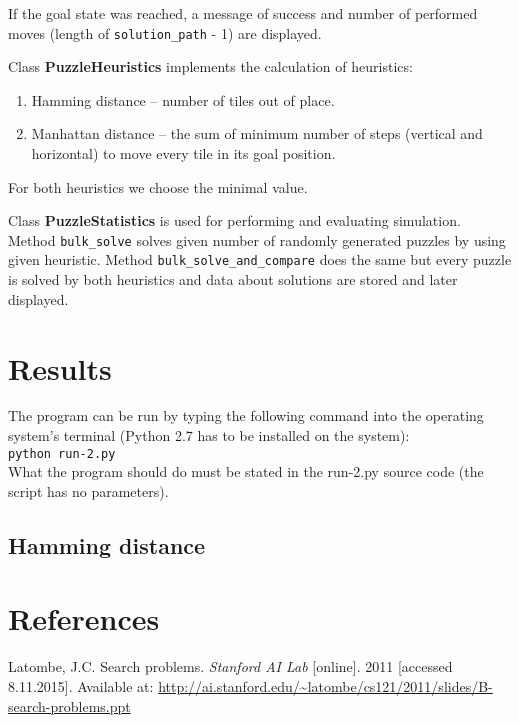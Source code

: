 \documentclass{article}
\begin{document}
If the goal state was reached, a message of success and number of performed moves (length of \texttt{solution\_path} - 1) are displayed. 

Class \textbf{PuzzleHeuristics} implements the calculation of heuristics:
\begin{enumerate}
\item Hamming distance -- number of tiles out of place.
\item Manhattan distance -- the sum of minimum number of steps (vertical and horizontal) to move every tile in its goal position.
\end{enumerate}
For both heuristics we choose the minimal value. 

Class \textbf{PuzzleStatistics} is used for performing and evaluating simulation. Method \texttt{bulk\_solve} solves given number of randomly generated puzzles by using given heuristic. Method \verb|bulk_solve_and_compare| does the same but every puzzle is solved by both heuristics and data about solutions are stored and later displayed. 

\section{Results}
The program can be run by typing the following command into the operating system's terminal (Python 2.7 has to be installed on the system): \\ 
\verb|python run-2.py| \\
What the program should do must be stated in the run-2.py source code (the script has no parameters).

\subsection{Hamming distance}



\section{References}

Latombe, J.C. Search problems. \textit{Stanford AI Lab} [online]. 2011 [accessed 8.11.2015]. Available at: \url{http://ai.stanford.edu/~latombe/cs121/2011/slides/B-search-problems.ppt}
\end{document}
